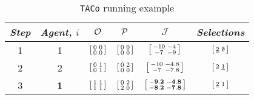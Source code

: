 \begin{table}[hbt!]
      \caption{\texttt{TACo} running example}
      \label{tab:locations}
      \centering
      \begin{tabular}{cccccc}\toprule
        \textit{Step} & \textit{Agent, $i$} & $\mathcal{O}$ & $\mathcal{P}$ & $\mathcal{J}$ & \textit{Selections} \\ \midrule
        
        1 & 1 & $\begin{bsmallmatrix} 0 & 0 \\ 0 & 0 \end{bsmallmatrix}$ & $\begin{bsmallmatrix} 0 & 0 \\ 0 & 0 \end{bsmallmatrix}$ & $\begin{bsmallmatrix} -10 & -4 \\ -7 & -9 \end{bsmallmatrix}$ & $\begin{bsmallmatrix} \underline{2} & \emptyset \end{bsmallmatrix}$ \\
        
        2 & 2 & $\begin{bsmallmatrix} 0 & 1 \\ 0 & 1 \end{bsmallmatrix}$ & $\begin{bsmallmatrix} 0 & 2 \\ 0 & 0 \end{bsmallmatrix}$ & $\begin{bsmallmatrix} -10 & -4.8 \\ -7 & -7.8 \end{bsmallmatrix}$ & $\begin{bsmallmatrix} 2 & \underline{1} \end{bsmallmatrix}$ \\

        3 & \bf{1} & $\begin{bsmallmatrix} 1 & 1 \\ 1 & 1 \end{bsmallmatrix}$ & $\begin{bsmallmatrix} 0 & 2 \\ 2 & 0 \end{bsmallmatrix}$ & $\begin{bsmallmatrix} \bf{-9.2} & \bf{-4.8} \\ \bf{-8.2} & \bf{-7.8} \end{bsmallmatrix}$ & $\begin{bsmallmatrix} \underline{2} & 1 \end{bsmallmatrix}$ \\


\end{tabular}
\end{table}
